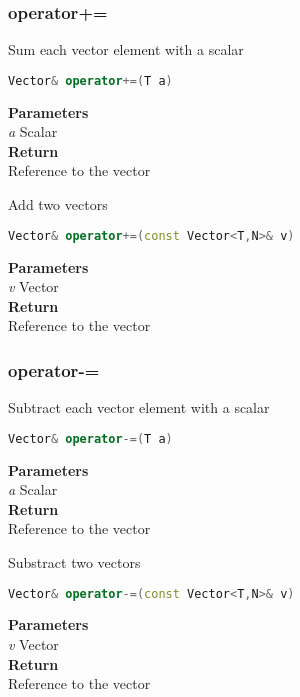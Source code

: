 \subsubsection{operator+=}
\begin{mdframed}
Sum each vector element with a scalar
\begin{lstlisting}[language=C++]
Vector& operator+=(T a)
\end{lstlisting}
\textbf{Parameters} \\ 
\textit{a} Scalar \\ 
\textbf{Return} \\ 
Reference to the vector\\ 
\end{mdframed}

\begin{mdframed}
Add two vectors
\begin{lstlisting}[language=C++]
Vector& operator+=(const Vector<T,N>& v)
\end{lstlisting}
\textbf{Parameters} \\ 
\textit{v} Vector \\ 
\textbf{Return} \\ 
Reference to the vector\\ 
\end{mdframed}

\subsubsection{operator-=}
\begin{mdframed}
Subtract each vector element with a scalar
\begin{lstlisting}[language=C++]
Vector& operator-=(T a)
\end{lstlisting}
\textbf{Parameters} \\ 
\textit{a} Scalar \\ 
\textbf{Return} \\ 
Reference to the vector\\ 
\end{mdframed}

\begin{mdframed}
Substract two vectors
\begin{lstlisting}[language=C++]
Vector& operator-=(const Vector<T,N>& v)
\end{lstlisting}
\textbf{Parameters} \\ 
\textit{v} Vector \\ 
\textbf{Return} \\ 
Reference to the vector\\ 
\end{mdframed}

